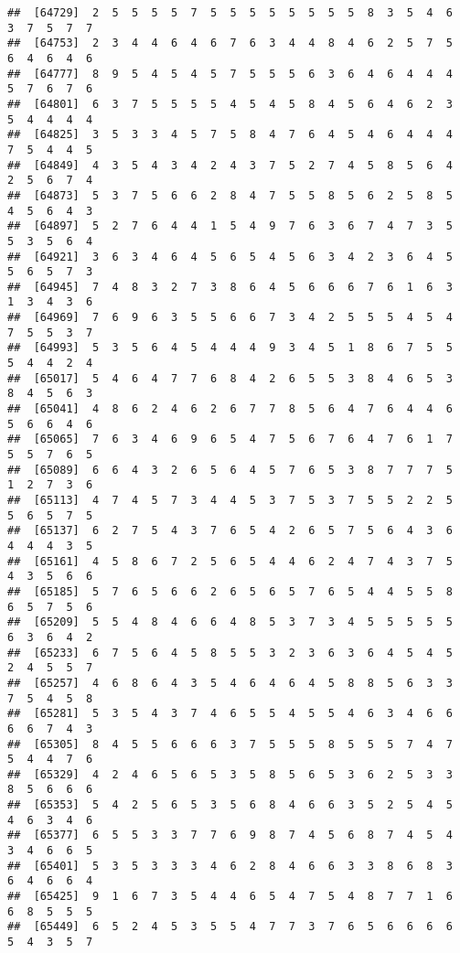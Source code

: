 \documentclass[
]{book}
\begin{document}
\begin{verbatim}
##  [64729]  2  5  5  5  5  7  5  5  5  5  5  5  5  5  8  3  5  4  6  3  7  5  7  7
##  [64753]  2  3  4  4  6  4  6  7  6  3  4  4  8  4  6  2  5  7  5  6  4  6  4  6
##  [64777]  8  9  5  4  5  4  5  7  5  5  5  6  3  6  4  6  4  4  4  5  7  6  7  6
##  [64801]  6  3  7  5  5  5  5  4  5  4  5  8  4  5  6  4  6  2  3  5  4  4  4  4
##  [64825]  3  5  3  3  4  5  7  5  8  4  7  6  4  5  4  6  4  4  4  7  5  4  4  5
##  [64849]  4  3  5  4  3  4  2  4  3  7  5  2  7  4  5  8  5  6  4  2  5  6  7  4
##  [64873]  5  3  7  5  6  6  2  8  4  7  5  5  8  5  6  2  5  8  5  4  5  6  4  3
##  [64897]  5  2  7  6  4  4  1  5  4  9  7  6  3  6  7  4  7  3  5  5  3  5  6  4
##  [64921]  3  6  3  4  6  4  5  6  5  4  5  6  3  4  2  3  6  4  5  5  6  5  7  3
##  [64945]  7  4  8  3  2  7  3  8  6  4  5  6  6  6  7  6  1  6  3  1  3  4  3  6
##  [64969]  7  6  9  6  3  5  5  6  6  7  3  4  2  5  5  5  4  5  4  7  5  5  3  7
##  [64993]  5  3  5  6  4  5  4  4  4  9  3  4  5  1  8  6  7  5  5  5  4  4  2  4
##  [65017]  5  4  6  4  7  7  6  8  4  2  6  5  5  3  8  4  6  5  3  8  4  5  6  3
##  [65041]  4  8  6  2  4  6  2  6  7  7  8  5  6  4  7  6  4  4  6  5  6  6  4  6
##  [65065]  7  6  3  4  6  9  6  5  4  7  5  6  7  6  4  7  6  1  7  5  5  7  6  5
##  [65089]  6  6  4  3  2  6  5  6  4  5  7  6  5  3  8  7  7  7  5  1  2  7  3  6
##  [65113]  4  7  4  5  7  3  4  4  5  3  7  5  3  7  5  5  2  2  5  5  6  5  7  5
##  [65137]  6  2  7  5  4  3  7  6  5  4  2  6  5  7  5  6  4  3  6  4  4  4  3  5
##  [65161]  4  5  8  6  7  2  5  6  5  4  4  6  2  4  7  4  3  7  5  4  3  5  6  6
##  [65185]  5  7  6  5  6  6  2  6  5  6  5  7  6  5  4  4  5  5  8  6  5  7  5  6
##  [65209]  5  5  4  8  4  6  6  4  8  5  3  7  3  4  5  5  5  5  5  6  3  6  4  2
##  [65233]  6  7  5  6  4  5  8  5  5  3  2  3  6  3  6  4  5  4  5  2  4  5  5  7
##  [65257]  4  6  8  6  4  3  5  4  6  4  6  4  5  8  8  5  6  3  3  7  5  4  5  8
##  [65281]  5  3  5  4  3  7  4  6  5  5  4  5  5  4  6  3  4  6  6  6  6  7  4  3
##  [65305]  8  4  5  5  6  6  6  3  7  5  5  5  8  5  5  5  7  4  7  5  4  4  7  6
##  [65329]  4  2  4  6  5  6  5  3  5  8  5  6  5  3  6  2  5  3  3  8  5  6  6  6
##  [65353]  5  4  2  5  6  5  3  5  6  8  4  6  6  3  5  2  5  4  5  4  6  3  4  6
##  [65377]  6  5  5  3  3  7  7  6  9  8  7  4  5  6  8  7  4  5  4  3  4  6  6  5
##  [65401]  5  3  5  3  3  3  4  6  2  8  4  6  6  3  3  8  6  8  3  6  4  6  6  4
##  [65425]  9  1  6  7  3  5  4  4  6  5  4  7  5  4  8  7  7  1  6  6  8  5  5  5
##  [65449]  6  5  2  4  5  3  5  5  4  7  7  3  7  6  5  6  6  6  6  5  4  3  5  7

\end{verbatim}
\end{document}
